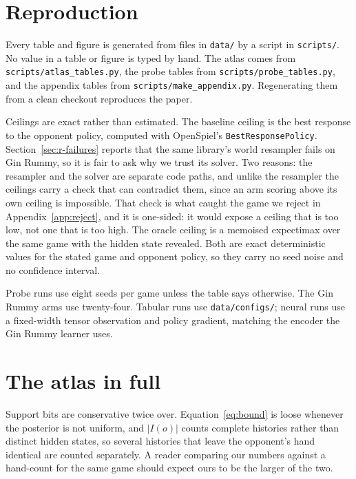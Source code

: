 \documentclass{article}
\begin{document}
\section{Reproduction}
\label{app:repro}

Every table and figure is generated from files in \texttt{data/} by a script in \texttt{scripts/}. No value in a table or figure is typed by hand. The atlas comes from \texttt{scripts/atlas\_tables.py}, the probe tables from \texttt{scripts/probe\_tables.py}, and the appendix tables from \texttt{scripts/make\_appendix.py}. Regenerating them from a clean checkout reproduces the paper.

Ceilings are exact rather than estimated. The baseline ceiling is the best response to the opponent policy, computed with OpenSpiel's \texttt{BestResponsePolicy}. Section~\ref{sec:r-failures} reports that the same library's world resampler fails on Gin Rummy, so it is fair to ask why we trust its solver. Two reasons: the resampler and the solver are separate code paths, and unlike the resampler the ceilings carry a check that can contradict them, since an arm scoring above its own ceiling is impossible. That check is what caught the game we reject in Appendix~\ref{app:reject}, and it is one-sided: it would expose a ceiling that is too low, not one that is too high. The oracle ceiling is a memoised expectimax over the same game with the hidden state revealed. Both are exact deterministic values for the stated game and opponent policy, so they carry no seed noise and no confidence interval.

Probe runs use eight seeds per game unless the table says otherwise. The Gin Rummy arms use twenty-four. Tabular runs use \texttt{data/configs/}; neural runs use a fixed-width tensor observation and policy gradient, matching the encoder the Gin Rummy learner uses.

\section{The atlas in full}
\label{app:atlas}

Support bits are conservative twice over. Equation~\eqref{eq:bound} is loose whenever the posterior is not uniform, and $|I(o)|$ counts complete histories rather than distinct hidden states, so several histories that leave the opponent's hand identical are counted separately. A reader comparing our numbers against a hand-count for the same game should expect ours to be the larger of the two.
\end{document}
